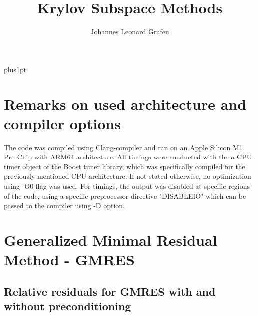 \documentclass[11pt,a4paper]{article}
\title{Krylov Subspace Methods}
\author{Johannes Leonard Grafen}
\begin{document}
\renewcommand\baselinestretch{1.0}
\baselineskip=18pt plus1pt	

\maketitle
\newpage
{}
\tableofcontents
\listoffigures	%
\listoftables  %
\newpage

\section{Remarks on used architecture and compiler options}
The code was compiled using Clang-compiler and ran on an Apple Silicon M1 Pro Chip with ARM64 architecture. All timings were conducted with the a CPU-timer object of the Boost timer library, which was specifically compiled for the previously mentioned CPU architecture. If not stated otherwise, no optimization using -O0 flag was used. For timings, the output was disabled at specific regions of the code, using a specific preprocessor directive "DISABLEIO" which can be passed to the compiler using -D option. 

\section{Generalized Minimal Residual Method - GMRES}
\label{chapter:GMRES}

\subsection{Relative residuals for GMRES with and without preconditioning}
\end{document}
